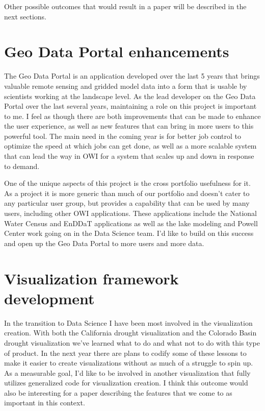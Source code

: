 \documentclass{article}
\begin{document}
Other possible outcomes that would result in a paper will be described in the next sections.

\section{Geo Data Portal enhancements}

The Geo Data Portal is an application developed over the last 5 years that brings valuable remote sensing and gridded model data into a form that is usable by scientists working at the landscape level.
As the lead developer on the Geo Data Portal over the last several years, maintaining a role on this project is important to me.
I feel as though there are both improvements that can be made to enhance the user experience, as well as new features that can bring in more users to this powerful tool.
The main need in the coming year is for better job control to optimize the speed at which jobs can get done, as well as a more scalable system that can lead the way in OWI for a system that scales up and down in response to demand.

One of the unique aspects of this project is the cross portfolio usefulness for it.
As a project it is more generic than much of our portfolio and doesn't cater to any particular user group, but provides a capability that can be used by many users, including other OWI applications.
These applications include the National Water Census and EnDDaT applications as well as the lake modeling and Powell Center work going on in the Data Science team.
I'd like to build on this success and open up the Geo Data Portal to more users and more data.

\section{Visualization framework development}

In the transition to Data Science I have been most involved in the visualization creation.
With both the California drought visualization and the Colorado Basin drought visualization we've learned what to do and what not to do with this type of product.
In the next year there are plans to codify some of these lessons to make it easier to create visualizations without as much of a struggle to spin up.
As a measurable goal, I'd like to be involved in another visualization that fully utilizes generalized code for visualization creation.
I think this outcome would also be interesting for a paper describing the features that we come to as important in this context.
\end{document}
